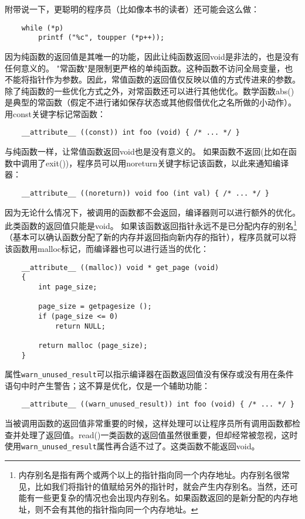 附带说一下，更聪明的程序员（比如像本书的读者）还可能会这么做：
\begin{lstlisting}
    while (*p)
        printf ("%c", toupper (*p++));
\end{lstlisting}

因为纯函数的返回值是其唯一的功能，因此让纯函数返回void是非法的，也是没有任何意义的。
"常函数"是限制更严格的单纯函数。这种函数不访问全局变量，也不能将指针作为参数。因此，常值函数的返回值仅反映以值的方式传进来的参数。除了纯函数的一些优化方式之外，对常函数还可以进行其他优化。数学函数abs()是典型的常函数（假定不进行诸如保存状态或其他假借优化之名所做的小动作）。用const关键字标记常函数：
\begin{lstlisting}
	__attribute__ ((const)) int foo (void) { /* ... */ }
\end{lstlisting}
与纯函数一样，让常值函数返回void也是没有意义的。
如果函数不返回(比如在函数中调用了exit())，程序员可以用noreturn关键字标记该函数，以此来通知编译器：
\begin{lstlisting}
	__attribute__ ((noreturn)) void foo (int val) { /* ... */ }
\end{lstlisting}
因为无论什么情况下，被调用的函数都不会返回，编译器则可以进行额外的优化。此类函数的返回值只能是void。
如果该函数返回指针永远不是已分配内存的别名\footnote{内存别名是指有两个或两个以上的指针指向同一个内存地址。内存别名很常见，比如我们将指针的值赋给另外的指针时，就会产生内存别名。当然，还可能有一些更复杂的情况也会出现内存别名。如果函数返回的是新分配的内存地址，则不会有其他的指针指向同一个内存地址。}（基本可以确认函数分配了新的内存并返回指向新内存的指针），程序员就可以将该函数用malloc标记，而编译器也可以进行适当的优化：
\begin{lstlisting}
    __attribute__ ((malloc)) void * get_page (void)
    {
        int page_size;
        
        page_size = getpagesize ();
        if (page_size <= 0)
            return NULL;
        
        return malloc (page_size);
    }

\end{lstlisting}
属性\verb+warn_unused_result+可以指示编译器在函数返回值没有保存或没有用在条件语句中时产生警告；这不算是优化，仅是一个辅助功能：
\begin{lstlisting}
    __attribute__ ((warn_unused_result)) int foo (void) { /* ... */ }
\end{lstlisting}
当被调用函数的返回值非常重要的时候，这样处理可以让程序员所有调用函数都检查并处理了返回值。read()一类函数的返回值虽然很重要，但却经常被忽视，这时使用\verb+warn_unused_result+属性再合适不过了。这类函数不能返回void。

